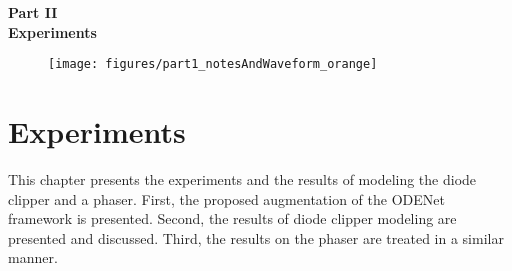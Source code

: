 \cleardoublepage
\thispagestyle{empty}
\begin{center}
\vspace*{3cm}
{\huge \bf Part II}\\ \vspace*{1cm}
{\Huge \bf Experiments}\\\vspace*{0.2cm}
\begin{figure}[ht]
\centering
\texttt{[image: figures/part1\_notesAndWaveform\_orange]}
\end{figure}
\end{center}
\label{par:part2}
\newpage
\quad
\thispagestyle{empty}
\newpage
\chapter{Experiments}
\label{chapter:experiments}

This chapter presents the experiments and the results of modeling the diode clipper and a phaser. First, the proposed augmentation of the ODENet framework is presented. Second, the results of diode clipper modeling are presented and discussed. Third, the results on the phaser are treated in a similar manner.




